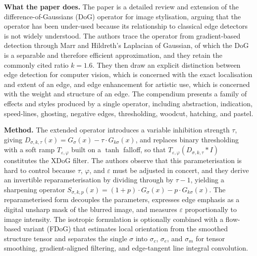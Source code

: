 \documentclass[11pt, a4paper]{article}
\begin{document}
\textbf{What the paper does.} The paper is a detailed review and extension of the difference-of-Gaussians (DoG) operator for image stylisation, arguing that the operator has been under-used because its relationship to classical edge detectors is not widely understood. The authors trace the operator from gradient-based detection through Marr and Hildreth's Laplacian of Gaussian, of which the DoG is a separable and therefore efficient approximation, and they retain the commonly cited ratio $k = 1.6$. They then draw an explicit distinction between edge detection for computer vision, which is concerned with the exact localisation and extent of an edge, and edge enhancement for artistic use, which is concerned with the weight and structure of an edge. The compendium presents a family of effects and styles produced by a single operator, including abstraction, indication, speed-lines, ghosting, negative edges, thresholding, woodcut, hatching, and pastel.

\textbf{Method.} The extended operator introduces a variable inhibition strength $\tau$, giving $D_{\sigma,k,\tau}(x) = G_\sigma(x) - \tau \cdot G_{k\sigma}(x)$, and replaces binary thresholding with a soft ramp $T_{\varepsilon,\varphi}$ built on a $\tanh$ falloff, so that $T_{\varepsilon,\varphi}(D_{\sigma,k,\tau} * I)$ constitutes the XDoG filter. The authors observe that this parameterisation is hard to control because $\tau$, $\varphi$, and $\varepsilon$ must be adjusted in concert, and they derive an invertible reparameterisation by dividing through by $\tau - 1$, yielding a sharpening operator $S_{\sigma,k,p}(x) = (1 + p) \cdot G_\sigma(x) - p \cdot G_{k\sigma}(x)$. The reparameterised form decouples the parameters, expresses edge emphasis as a digital unsharp mask of the blurred image, and measures $\varepsilon$ proportionally to image intensity. The isotropic formulation is optionally combined with a flow-based variant (FDoG) that estimates local orientation from the smoothed structure tensor and separates the single $\sigma$ into $\sigma_c$, $\sigma_e$, and $\sigma_m$ for tensor smoothing, gradient-aligned filtering, and edge-tangent line integral convolution.
\end{document}
